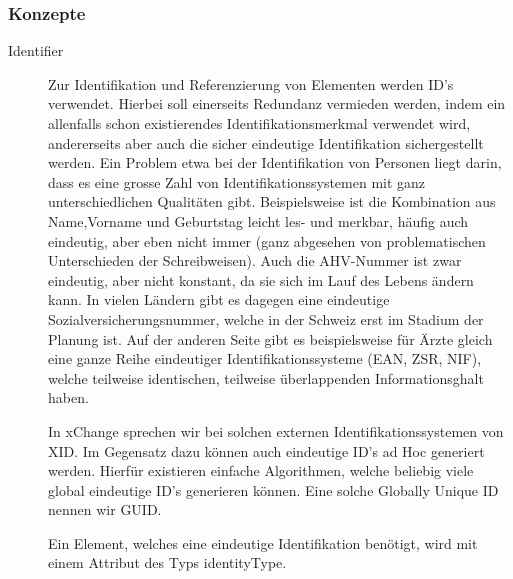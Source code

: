 \documentclass[a4paper]{scrartcl}
\begin{document}
\subsubsection{Konzepte}
\begin{description}
\item[Identifier] Zur Identifikation und Referenzierung von Elementen werden ID's verwendet. Hierbei soll einerseits Redundanz vermieden werden, indem ein allenfalls schon existierendes Identifikationsmerkmal verwendet wird, andererseits aber auch die sicher eindeutige Identifikation sichergestellt werden. Ein Problem etwa bei der Identifikation von Personen liegt darin, dass es eine grosse Zahl von Identifikationssystemen mit ganz unterschiedlichen Qualitäten gibt. Beispielsweise ist die Kombination aus Name,Vorname und Geburtstag leicht les- und merkbar, häufig auch eindeutig, aber eben nicht immer (ganz abgesehen von problematischen Unterschieden der Schreibweisen). Auch die AHV-Nummer ist zwar eindeutig, aber nicht konstant, da sie sich im Lauf des Lebens ändern kann. In vielen Ländern gibt es dagegen eine eindeutige Sozialversicherungsnummer, welche in der Schweiz erst im Stadium der Planung ist. Auf der anderen Seite gibt es beispielsweise für Ärzte gleich eine ganze Reihe eindeutiger Identifikationssysteme (EAN, ZSR, NIF), welche teilweise identischen, teilweise überlappenden Informationsghalt haben.
    
    In xChange sprechen wir bei solchen externen Identifikationssystemen von XID. Im Gegensatz dazu können auch eindeutige ID's ad Hoc generiert werden. Hierfür existieren einfache Algorithmen, welche beliebig viele global eindeutige ID's generieren können. Eine solche \glqq Globally Unique ID\grqq{} nennen wir GUID.
    
    Ein Element, welches eine eindeutige Identifikation benötigt, wird mit einem Attribut des Typs identityType.
\end{description}
\end{document}
